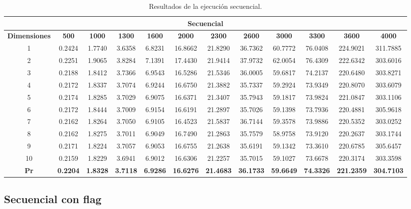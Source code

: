 \documentclass{article}
\begin{document}
\begin{table}[H]
\centering
\tiny
\begin{tabular}{|c|c|c|c|c|c|c|c|c|c|c|c|}
\hline
\multicolumn{12}{|c|}{\textbf{Secuencial}} \\
\hline
\textbf{Dimensiones} & \textbf{500} & \textbf{1000} & \textbf{1300} & \textbf{1600} & \textbf{2000} & \textbf{2300} & \textbf{2600} & \textbf{3000} & \textbf{3300} & \textbf{3600} & \textbf{4000} \\
\hline
1  & 0.2424 & 1.7740 & 3.6358 & 6.8231 & 16.8662 & 21.8290 & 36.7362 & 60.7772 & 76.0408 & 224.9021 & 311.7885 \\
2  & 0.2251 & 1.9065 & 3.8284 & 7.1391 & 17.4430 & 21.9414 & 37.9732 & 62.0054 & 76.4309 & 222.6342 & 303.6016 \\
3  & 0.2188 & 1.8412 & 3.7366 & 6.9543 & 16.5286 & 21.5346 & 36.0005 & 59.6817 & 74.2137 & 220.6480 & 303.8271 \\
4  & 0.2172 & 1.8337 & 3.7074 & 6.9244 & 16.6750 & 21.3882 & 35.7337 & 59.2924 & 73.9349 & 220.8070 & 303.6079 \\
5  & 0.2174 & 1.8285 & 3.7029 & 6.9075 & 16.6371 & 21.3407 & 35.7943 & 59.1817 & 73.9824 & 221.0847 & 303.1106 \\
6  & 0.2172 & 1.8444 & 3.7009 & 6.9154 & 16.6191 & 21.2897 & 35.7026 & 59.1398 & 73.7936 & 220.4881 & 305.9618 \\
7  & 0.2162 & 1.8264 & 3.7050 & 6.9105 & 16.4523 & 21.5837 & 36.7144 & 59.3578 & 73.9886 & 220.5352 & 303.0252 \\
8  & 0.2162 & 1.8275 & 3.7011 & 6.9049 & 16.7490 & 21.2863 & 35.7579 & 58.9758 & 73.9120 & 220.2637 & 303.1744 \\
9  & 0.2171 & 1.8224 & 3.7057 & 6.9053 & 16.6755 & 21.2638 & 35.6191 & 59.1342 & 73.3610 & 220.6785 & 305.6457 \\
10 & 0.2159 & 1.8229 & 3.6941 & 6.9012 & 16.6306 & 21.2257 & 35.7015 & 59.1027 & 73.6678 & 220.3174 & 303.3598 \\
\hline
\textbf{Pr} & \textbf{0.2204} & \textbf{1.8328} & \textbf{3.7118} & \textbf{6.9286} & \textbf{16.6276} & \textbf{21.4683} & \textbf{36.1733} & \textbf{59.6649} & \textbf{74.3326} & \textbf{221.2359} & \textbf{304.7103} \\
\hline
\end{tabular}
\label{tab:secuencial}

\caption{Resultados de la ejecución secuencial.}
\end{table}

\subsection{Secuencial con flag}
\end{document}
